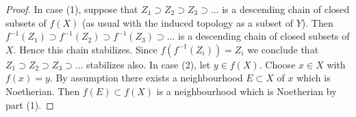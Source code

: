 \documentclass[10pt,a4paper]{amsart}
\theoremstyle{plain}
\theoremstyle{definition}
\theoremstyle{remark}
\numberwithin{equation}{subsection}
\begin{document}
\begin{proof}
In case (1), suppose that $Z_1 \supset Z_2 \supset Z_3 \supset \ldots$
is a descending chain of closed subsets of $f(X)$ (as usual with the induced
topology as a subset of $Y$). Then
$f^{-1}(Z_1) \supset f^{-1}(Z_2) \supset f^{-1}(Z_3) \supset \ldots$ is
a descending chain of closed subsets of $X$. Hence this chain stabilizes.
Since $f(f^{-1}(Z_i)) = Z_i$ we conclude that
$Z_1 \supset Z_2 \supset Z_3 \supset \ldots$
stabilizes also. In case (2), let $y \in f(X)$. Choose $x \in X$ with
$f(x) = y$. By assumption there exists a neighbourhood $E \subset X$ of
$x$ which is Noetherian. Then $f(E) \subset f(X)$ is a neighbourhood
which is Noetherian by part (1).
\end{proof}
\end{document}
